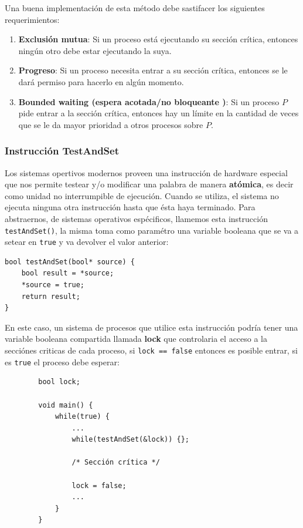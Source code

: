 Una buena implementación de esta método debe sastifacer los siguientes requerimientos:
\begin{enumerate}
	\item \textbf{Exclusión mutua}: Si un proceso está ejecutando su sección crítica,
	 entonces ningún otro debe estar ejecutando la suya.
 	\item \textbf{Progreso}: Si un proceso necesita entrar a su sección crítica, entonces se le dará permiso para hacerlo en algún momento.
	\item \textbf{Bounded waiting (espera acotada/no bloqueante	)}: Si un proceso $P$ pide entrar a la sección crítica, entonces hay un límite en la cantidad de veces que se le da mayor prioridad a otros procesos sobre $P$.
\end{enumerate}
\subsubsection{Instrucción TestAndSet}
Los sistemas opertivos modernos proveen una instrucción de hardware especial que nos permite testear y/o modificar una palabra de manera \textbf{atómica}, es decir como unidad no interrumpible de ejecución. Cuando se utiliza, el sistema no ejecuta ninguna otra instrucción hasta que ésta haya terminado. Para abstraernos, de sistemas operativos espécificos, llamemos esta instrucción \texttt{testAndSet()}, la misma toma como paramétro una variable booleana que se va a setear en \texttt{true} y va devolver el valor anterior:

\begin{center}
	\begin{minipage}{0.5\textwidth}
		\begin{verbatim}
bool testAndSet(bool* source) {
	bool result = *source;
	*source = true;
	return result;
}
		\end{verbatim}
	\end{minipage}
\end{center}

En este caso, un sistema de procesos que utilice esta instrucción podría tener una variable booleana compartida llamada \textbf{lock} que controlaria el acceso a la secciónes criticas de cada proceso, si \texttt{lock == false} entonces es posible entrar, si es \texttt{true} el proceso debe esperar:

\begin{verbatim}
		bool lock;
		
		void main() {
			while(true) {
				...
				while(testAndSet(&lock)) {};
		
				/* Sección crítica */
		
				lock = false;
				...
			}	
		}
\end{verbatim}

